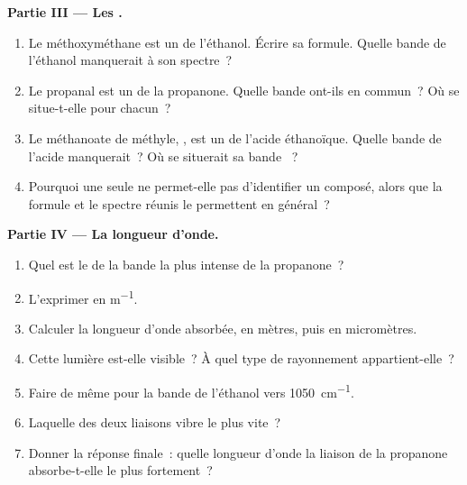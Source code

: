\begin{problem}
\medskip
\noindent\textbf{Partie III --- Les .}
\begin{enumerate}[resume]
  \item Le méthoxyméthane est un  de l'éthanol. Écrire sa formule.
        Quelle bande de l'éthanol manquerait à son spectre~?
  \item Le propanal est un  de la propanone. Quelle bande ont-ils
        en commun~? Où se situe-t-elle pour chacun~?
  \item Le méthanoate de méthyle, , est un  de l'acide
        éthanoïque. Quelle bande de l'acide manquerait~? Où se situerait
        sa bande ~?
  \item Pourquoi une  seule ne permet-elle pas d'identifier
        un composé, alors que la formule et le spectre réunis le
        permettent en général~?
\end{enumerate}

\medskip
\noindent\textbf{Partie IV --- La longueur d'onde.}
\begin{enumerate}[resume]
  \item Quel est le  de la bande la plus intense de la
        propanone~?
  \item L'exprimer en \si{m^{-1}}.
  \item Calculer la longueur d'onde absorbée, en mètres, puis en
        micromètres.
  \item Cette lumière est-elle visible~? À quel type de rayonnement
        appartient-elle~?
  \item Faire de même pour la bande  de l'éthanol vers
        \qty{1050}{cm^{-1}}.
  \item Laquelle des deux liaisons vibre le plus vite~?
  \item Donner la réponse finale~: quelle longueur d'onde la liaison
         de la propanone absorbe-t-elle le plus fortement~?
\end{enumerate}
\end{problem}

